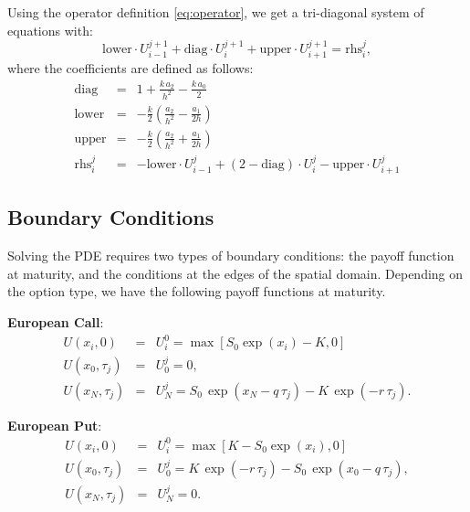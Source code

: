 \documentclass[11pt, letterpaper]{article}
\begin{document}
        Using the operator definition \eqref{eq:operator}, we get a tri-diagonal system of equations with:
        \begin{equation}
            \text{lower}\cdot U_{i-1}^{j+1} + \text{diag}\cdot U_i^{j+1} + \text{upper}\cdot U_{i+1}^{j+1} = \text{rhs}_i^j,
        \end{equation}
        where the coefficients are defined as follows:
        \begin{eqnarray}
            \text{diag} &=& 1 + \frac{k\, a_2}{h^2} - \frac{k\, a_0}{2} \nonumber\\
            \text{lower} &=& -\frac{k}{2} \left(\frac {a_2}{h^2} - \frac{a_1}{2h} \right)\\
            \text{upper} &=& -\frac{k}{2} \left(\frac {a_2}{h^2} + \frac{a_1}{2h} \right)\nonumber\\
            \text{rhs}_i^j &=& - \text{lower}\cdot U_{i-1}^j + (2 - \text{diag})\cdot U_i^j - \text{upper}\cdot U_{i+1}^j\nonumber
        \end{eqnarray}

        \subsection{Boundary Conditions}

        Solving the PDE requires two types of boundary conditions: the payoff function at maturity, and the conditions at the edges of the spatial domain. 
        Depending on the option type, we have the following payoff functions at maturity.

        \textbf{European Call}:
        \begin{eqnarray}
            U(x_i, 0) &=& U_{i}^0 = \max \left[S_0 \exp(x_i) - K, 0\right]\nonumber\\
            U(x_0, \tau_j) & = & U_0^j= 0,\\
            U(x_N, \tau_j) & = & U_{N}^j = S_0\, \exp(x_N - q\, \tau_j) - K\, \exp(-r\, \tau_j).\nonumber
        \end{eqnarray}

        \textbf{European Put}:
        \begin{eqnarray}
            U(x_i, 0) &=& U_{i}^0 = \max \left[K - S_0 \exp(x_i), 0\right]\nonumber\\
            U(x_0, \tau_j) & = & U_0^j =  K\, \exp(-r\, \tau_j) - S_0\, \exp(x_0 - q\, \tau_j),\\
            U(x_N, \tau_j) & = & U_{N}^j = 0.\nonumber
        \end{eqnarray}
\end{document}

